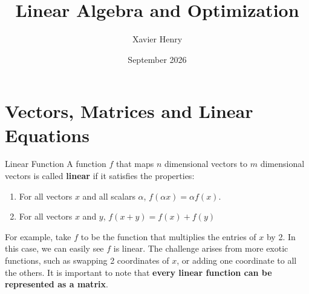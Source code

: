 \documentclass[11pt]{article}
\title{Linear Algebra and Optimization}
\author{Xavier Henry}
\date{September 2026}
\begin{document}
\maketitle

\tableofcontents \newpage

\section{Vectors, Matrices and Linear Equations}

\begin{definitionbox}{Linear Function}
    A function $f$ that maps $n$ dimensional vectors to $m$ dimensional vectors is called \textbf{linear} if it satisfies the properties:
    \begin{enumerate}
        \item For all vectors $x$ and all scalars $\alpha$, $f(\alpha x) = \alpha f(x)$.
        \item For all vectors $x$ and $y$, $f(x+y)=f(x)+f(y)$
    \end{enumerate}
\end{definitionbox}

For example, take $f$ to be the function that multiplies the entries of $x$ by 2. In this case, we can easily see $f$ is linear. The challenge arises from more exotic functions, such as swapping 2 coordinates of $x$, or adding one coordinate to all the others. It is important to note that \textbf{every linear function can be represented as a matrix}.
\end{document}
